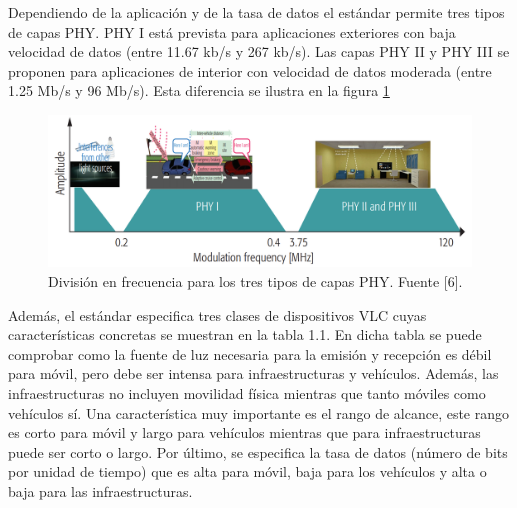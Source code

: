 Dependiendo de la aplicación y de la tasa de datos el estándar permite tres tipos de 
capas PHY. PHY I está prevista para aplicaciones exteriores con baja velocidad de 
datos (entre 11.67 kb/s y 267 kb/s). Las capas PHY II y PHY III se proponen para 
aplicaciones de interior con velocidad de datos moderada (entre 1.25 Mb/s y 96 Mb/s).
Esta diferencia se ilustra en la figura \ref{capasPHY}

\begin{figure}[ht]
    \centering
    \includegraphics[scale=0.35]{./figuras/capasEstandar.png}
    \caption{\small{División en frecuencia para los tres tipos de capas PHY. Fuente [6].}}
    \label{capasPHY}%
\end{figure}

Además, el estándar especifica tres clases de dispositivos VLC cuyas características 
concretas se muestran en la tabla 1.1. En dicha tabla se puede comprobar como la fuente de 
luz necesaria para la emisión y recepción es débil para móvil, pero debe ser intensa para 
infraestructuras y vehículos. Además, las infraestructuras no incluyen movilidad física 
mientras que tanto móviles como vehículos sí. Una característica muy importante es el 
rango de alcance, este rango es corto para móvil y largo para vehículos mientras que 
para infraestructuras puede ser corto o largo. Por último, se especifica la tasa de datos
(número de bits por unidad de tiempo) que es alta para móvil, baja para los vehículos y 
alta o baja para las infraestructuras.


